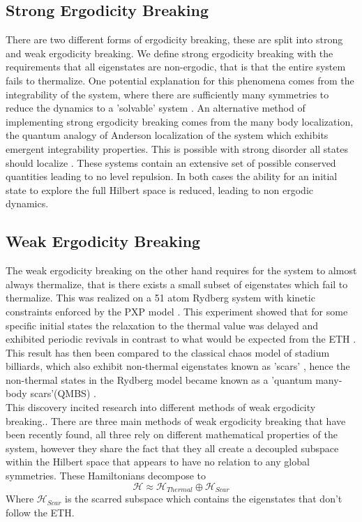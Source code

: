 \subsection{Strong Ergodicity Breaking}
There are two different forms of ergodicity breaking, these are split into strong and weak ergodicity breaking. We define strong ergodicity breaking with the requirements that all eigenstates are non-ergodic, that is that the entire system fails to thermalize. One potential explanation for this phenomena comes from the integrability of the system, where there are sufficiently many symmetries to reduce the dynamics to a 'solvable' system \citep{kinoshita_quantum_2006}. An alternative method of implementing strong ergodicity breaking comes from the many body localization, the quantum analogy of Anderson localization of the system which exhibits emergent integrability properties. This is possible with strong disorder all states should localize \citep{Guan_AndersonLocalization}. These systems contain an extensive set of possible conserved quantities leading to no level repulsion. In both cases the ability for an initial state to explore the full Hilbert space is reduced, leading to non ergodic dynamics.\citep{ALET_MBLrev} 
\subsection{Weak Ergodicity Breaking}
The weak ergodicity breaking on the other hand requires for the system to almost always thermalize, that is there exists a small subset of eigenstates which fail to thermalize. This was realized on a 51 atom Rydberg system with kinetic constraints enforced by the PXP model \citep{bernien_probing_2017}. This experiment showed that for some specific initial states the relaxation to the thermal value was delayed and exhibited periodic revivals in contrast to what would be expected from the ETH . This result has then been compared to the classical chaos model of stadium billiards, which also exhibit non-thermal eigenstates known as 'scars' \cite{heller_bound-state_1984}, hence the non-thermal states in the Rydberg model became known as a 'quantum many-body scars'(QMBS) \cite{turner_quantum_2018}. \citep{keski-rahkonen_controllable_2017}
\\
This discovery incited research into different methods of weak ergodicity breaking.\cite{serbyn_quantum_2021}. There are three main methods of weak ergodicity breaking that have been recently found, all three rely on different mathematical properties of the system, however they share the fact that they all create a decoupled subspace within the Hilbert space that appears to have no relation to any global symmetries.  These Hamiltonians decompose to
\begin{equation}
\mathcal{H} \approx \mathcal{H}_{Thermal} \oplus \mathcal{H}_{Scar}
\end{equation}
Where $\mathcal{H}_{Scar}$ is the scarred subspace which contains the eigenstates that don't follow the ETH. 
